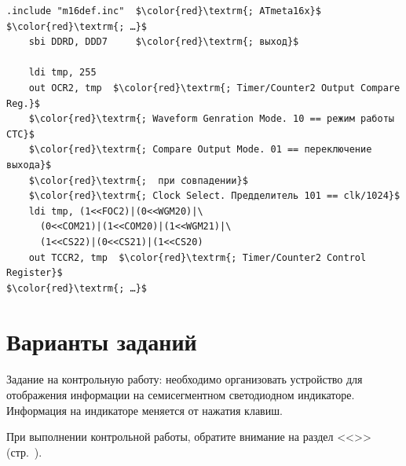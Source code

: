 \documentclass[main.tex]{subfiles}
\begin{document}
\begin{lstlisting}
.include "m16def.inc"  $\color{red}\textrm{; ATmeta16x}$
$\color{red}\textrm{; …}$
    sbi DDRD, DDD7     $\color{red}\textrm{; выход}$

    ldi tmp, 255
    out OCR2, tmp  $\color{red}\textrm{; Timer/Counter2 Output Compare Reg.}$
    $\color{red}\textrm{; Waveform Genration Mode. 10 == режим работы CTC}$
    $\color{red}\textrm{; Compare Output Mode. 01 == переключение выхода}$
    $\color{red}\textrm{;  при совпадении}$
    $\color{red}\textrm{; Clock Select. Предделитель 101 == clk/1024}$
    ldi tmp, (1<<FOC2)|(0<<WGM20)|\
      (0<<COM21)|(1<<COM20)|(1<<WGM21)|\
      (1<<CS22)|(0<<CS21)|(1<<CS20)
    out TCCR2, tmp  $\color{red}\textrm{; Timer/Counter2 Control Register}$
$\color{red}\textrm{; …}$
\end{lstlisting}










\newpage
\section{Варианты заданий}\label{ch:var2}

Задание на контрольную работу: необходимо организовать устройство для отображения информации на семисегментном светодиодном индикаторе. Информация на индикаторе меняется от нажатия клавиш.

При выполнении контрольной работы, обратите внимание на раздел <<\nameref{ch:str}>> (стр.~\pageref{ch:str}).
\end{document}
